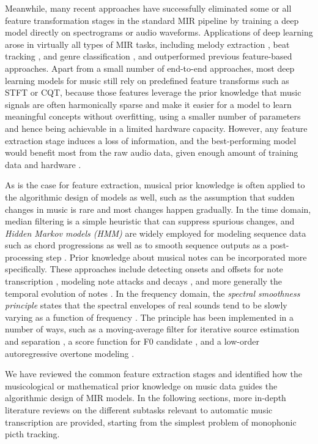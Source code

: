 Meanwhile, many recent approaches have successfully eliminated some or all feature transformation stages in the standard MIR pipeline by training a deep model directly on spectrograms or audio waveforms.
Applications of deep learning arose in virtually all types of MIR tasks, including melody extraction \cite{bittner2017deepsalience}, beat tracking \cite{vogl2017drum}, and genre classification \cite{oramas2017genre}, and outperformed previous feature-based approaches.
Apart from a small number of end-to-end approaches, most deep learning models for music still rely on predefined feature transforms such as STFT or CQT, because those features leverage the prior knowledge that music signals are often harmonically sparse and make it easier for a model to learn meaningful concepts without overfitting, using a smaller number of parameters and hence being achievable in a limited hardware capacity.
However, any feature extraction stage induces a loss of information, and the best-performing model would benefit most from the raw audio data, given enough amount of training data and hardware \cite{pons2018tagging}.


As is the case for feature extraction, musical prior knowledge is often applied to the algorithmic design of models as well, such as the assumption that sudden changes in music is rare and most changes happen gradually.
In the time domain, median filtering \cite{oudre2009chord} is a simple heuristic that can suppress spurious changes, and \textit{Hidden Markov models (HMM)} are widely employed for modeling sequence data such as chord progressions \cite{cho2010chord} as well as to smooth sequence outputs as a post-processing step \cite{khadkevich2009hmm}.
Prior knowledge about musical notes can be incorporated more specifically. These approaches include detecting onsets and offsets for note transcription \cite{benetos2011polyphonic}, modeling note attacks and decays \cite{cheng2016attackdecay}, and more generally the temporal evolution of notes \cite{cogliati2015temporal}.
In the frequency domain, the \textit{spectral smoothness principle} states that the spectral envelopes of real sounds tend to be slowly varying as a function of frequency \cite{klapuri2003multiple}.
The principle has been implemented in a number of ways, such as a moving-average filter for iterative source estimation and separation \cite{klapuri2003multiple}, a score function for F0 candidate \cite{yeh2010mffe}, and a low-order autoregressive overtone modeling \cite{emiya2010smoothness}.

We have reviewed the common feature extraction stages and identified how the musicological or mathematical prior knowledge on music data guides the algorithmic design of MIR models.
In the following sections, more in-depth literature reviews on the different subtasks relevant to automatic music transcription are provided, starting from the simplest problem of monophonic picth tracking.


